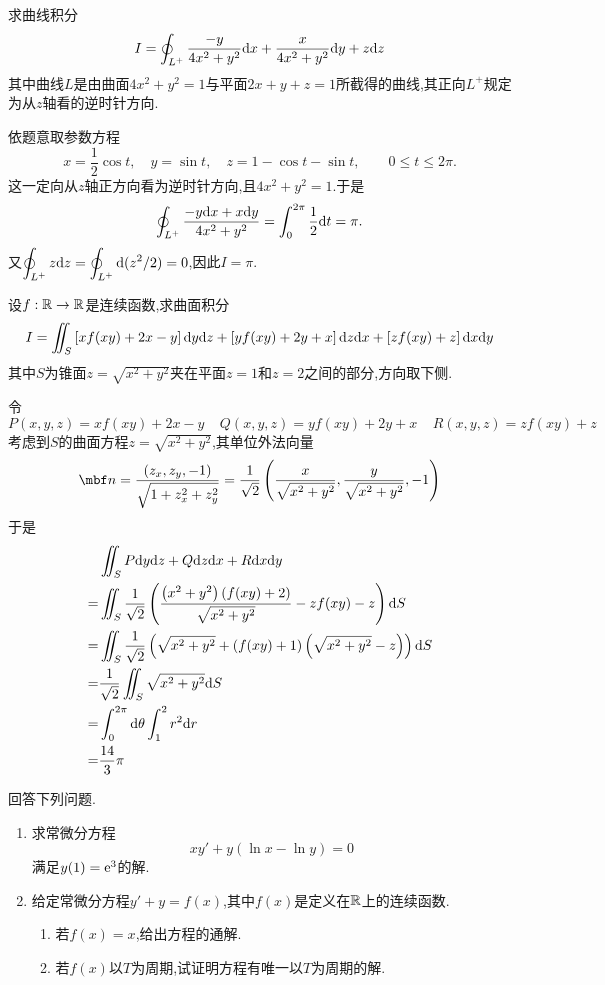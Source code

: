 \documentclass{ctexart}
\begin{document}
\begin{problem}[2.(20\songti{分})]
    求曲线积分
    \[I=\oint_{L^+}\dfrac{-y}{4x^2+y^2}\mathrm{d} x+\dfrac{x}{4x^2+y^2}\mathrm{d} y+z\mathrm{d} z\]
    其中曲线$L$是由曲面$4x^2+y^2=1$与平面$2x+y+z=1$所截得的曲线,其正向$L^+$规定为从$z$轴看的逆时针方向.
\end{problem}
\begin{solution}
依题意取参数方程
    \[x=\dfrac12\cos t,\quad y=\sin t,\quad z=1-\cos t-\sin t,\qquad0\leqslant t\leqslant2\pi.\]
    这一定向从$z$轴正方向看为逆时针方向,且$4x^2+y^2=1$.于是
    \[\oint_{L^+}\dfrac{-y\mathrm{d} x+x\mathrm{d} y}{4x^2+y^2}
      =\int_0^{2\pi}\dfrac12\mathrm{d} t=\pi.\]
    又$\displaystyle\oint_{L^+}z\mathrm{d} z=\oint_{L^+}\mathrm{d}(z^2/2)=0$,因此$I=\pi$.
\end{solution}
\begin{problem}[3.(20\songti{分})]
    设$f:\mathbb{R}\to\mathbb{R}$是连续函数,求曲面积分
    \[I=\iint_S\left[xf(xy)+2x-y\right]\mathrm{d} y\mathrm{d} z+\left[yf(xy)+2y+x\right]\mathrm{d} z\mathrm{d} x+\left[zf(xy)+z\right]\mathrm{d} x\mathrm{d} y\]
    其中$S$为锥面$z=\sqrt{x^2+y^2}$夹在平面$z=1$和$z=2$之间的部分,方向取下侧.
\end{problem}
\begin{solution}
    令
    \[P(x,y,z)=xf(xy)+2x-y\ \ \ \ \ Q(x,y,z)=yf(xy)+2y+x\ \ \ \ \ R(x,y,z)=zf(xy)+z\]
    考虑到$S$的曲面方程$z=\sqrt{x^2+y^2}$,其单位外法向量
    \[\mbf n=\dfrac{\left(z_x,z_y,-1\right)}{\sqrt{1+z_x^2+z_y^2}}
    =\dfrac{1}{\sqrt2}\left(\dfrac{x}{\sqrt{x^2+y^2}},\dfrac{y}{\sqrt{x^2+y^2}},-1\right)\]
    于是
    \[\begin{aligned}
        &\iint_{S}P\mathrm{d} y\mathrm{d} z+Q\mathrm{d} z\mathrm{d} x+R\mathrm{d} x\mathrm{d} y\\
        =&\iint_{S}\dfrac{1}{\sqrt2}\left(\dfrac{\left(x^2+y^2\right)\left(f(xy)+2\right)}{\sqrt{x^2+y^2}}-zf(xy)-z\right)\mathrm{d} S \\
        =&\iint_{S}\dfrac{1}{\sqrt2}\left(\sqrt{x^2+y^2}+\left(f(xy)+1\right)\left(\sqrt{x^2+y^2}-z\right)\right)\mathrm{d} S \\
        =&\dfrac{1}{\sqrt2}\iint_{S}\sqrt{x^2+y^2}\mathrm{d} S \\
        =&\int_0^{2\pi}\mathrm{d}\theta\int_1^2r^2\mathrm{d} r \\
        =&\dfrac{14}{3}\pi
    \end{aligned}\]
\end{solution}
\begin{problem}[4.(20\songti{分})]
    回答下列问题.
    \begin{enumerate}[label=\tbf{(\arabic*)}]
        \item 求常微分方程
            \[xy'+y\left(\ln x-\ln y\right)=0\]
            满足$y(1)=\mathrm{e}^3$的解.
        \item 给定常微分方程$y'+y=f(x)$,其中$f(x)$是定义在$\mathbb{R}$上的连续函数.
            \begin{enumerate}[label=\tbf{(\alph*)}]
                \item 若$f(x)=x$,给出方程的通解.
                \item 若$f(x)$以$T$为周期,试证明方程有唯一以$T$为周期的解.
            \end{enumerate}
    \end{enumerate}    
\end{problem}
\end{document}
